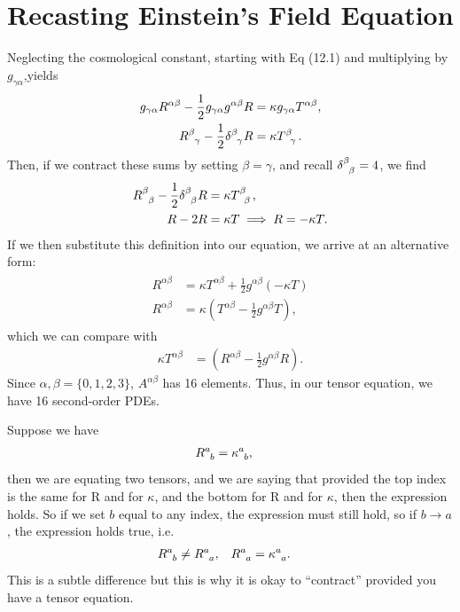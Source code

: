 \documentclass[a4paper, 11pt, normalem]{report}
\begin{document}
\section{Recasting Einstein's Field Equation}
Neglecting the cosmological constant, starting with Eq (12.1) and multiplying by $g_{\gamma\alpha}$,yields
\begin{align}
    g_{\gamma\alpha}R^{\alpha\beta} - \frac12g_{\gamma\alpha}g^{\alpha\beta}R &= \kappa g_{\gamma\alpha}T^{\alpha\beta}, \\
    \tensor{R}{^\beta_\gamma} - \frac12\tensor{\delta}{^\beta_\gamma}R &= \kappa\tensor{T}{^\beta_\gamma}.
\end{align}
Then, if we contract these sums by setting $\beta=\gamma$, and recall $\tensor{\delta}{^\beta_\beta}=4$, we find
\begin{align}
    \tensor{R}{^\beta_\beta} - \frac12\tensor{\delta}{^\beta_\beta}R &= \kappa\tensor{T}{^\beta_\beta}, \\
    R - 2R &= \kappa T \implies R = -\kappa T.
\end{align}
If we then substitute this definition into our equation, we arrive at an alternative form:
\begin{align}
    \begin{split}
        R^{\alpha\beta} &= \kappa T^{\alpha\beta} + \frac12g^{\alpha\beta}(-\kappa T) \\
        R^{\alpha\beta} &= \kappa\left(T^{\alpha\beta} - \frac12g^{\alpha\beta}T\right),
    \end{split}
\end{align}
which we can compare with 
\begin{align}
    \kappa T^{\alpha\beta} &= \left(R^{\alpha\beta} - \frac12g^{\alpha\beta}R\right).
\end{align}
Since $\alpha,\beta=\{0,1,2,3\}$, $A^{\alpha\beta}$ has 16 elements.
Thus, in our tensor equation, we have 16 second-order PDEs.
\begin{note}
Suppose we have
\begin{align}
    \tensor{R}{^a_b} &= \tensor{\kappa}{^a_b},
\end{align}
then we are equating two tensors, and we are saying that provided the top index is the same for R and for $\kappa$, and the bottom for R and for $\kappa$, then the expression holds. 
So if we set $b$ equal to any index, the expression must still hold, so if $b\to a$, the expression holds true, i.e. 
\begin{align}
    \tensor{R}{^a_b} &\neq \tensor{R}{^a_a}, & \tensor{R}{^a_a} &= \tensor{\kappa}{^a_a}.
\end{align}
This is a subtle difference but this is why it is okay to ``contract'' provided you have a tensor equation. 
\end{note}
\end{document}
